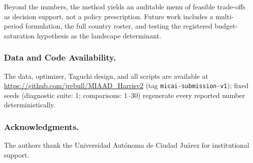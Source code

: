 \documentclass[runningheads]{llncs}
\begin{document}
Beyond the numbers, the method yields an auditable menu of feasible trade-offs as decision support, not a policy prescription. Future work includes a multi-period formulation, the full country roster, and testing the registered budget-saturation hypothesis as the landscape determinant.

\subsubsection*{Data and Code Availability.}
The data, optimizer, Taguchi design, and all scripts are available at \url{https://github.com/jrebull/MIAAD_Harrisv2} (tag \texttt{micai-submission-v1}); fixed seeds (diagnostic suite: 1; comparisons: 1--30) regenerate every reported number deterministically.

\subsubsection*{Acknowledgments.}
The authors thank the Universidad Aut\'onoma de Ciudad Ju\'arez for institutional support.
\end{document}
